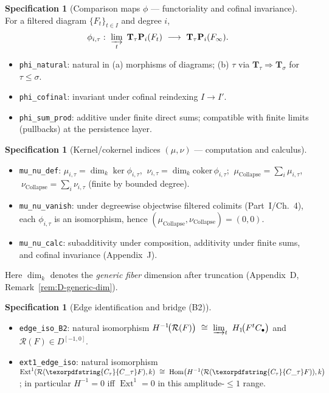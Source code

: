 \documentclass[11pt]{article}
\DeclareMathOperator{\Ext}{Ext}
\DeclareMathOperator{\Hom}{Hom}
\newcommand{\Rfun}{\mathcal{R}}
\numberwithin{equation}{section}
\theoremstyle{definition}
\newtheorem{specification}[theorem]{Specification}
\DeclareRobustCommand{\Ctau}{\texorpdfstring{\ensuremath{C_{\tau}}}{C\_\tau}}
\DeclareRobustCommand{\muc}{\mu_{\mathrm{Collapse}}}
\DeclareRobustCommand{\nuc}{\nu_{\mathrm{Collapse}}}
\begin{document}
\begin{specification}[Comparison maps $\phi$ — functoriality and cofinal invariance]
For a filtered diagram $\{F_t\}_{t\in I}$ and degree $i$,
\[
\phi_{i,\tau}:\ \varinjlim_{t}\ \mathbf{T}_\tau\mathbf{P}_i(F_t)\ \longrightarrow\ \mathbf{T}_\tau\mathbf{P}_i(F_\infty).
\]
\begin{itemize}
  \item \texttt{phi\_natural}: natural in (a) morphisms of diagrams; (b) $\tau$ via $\mathbf{T}_\tau\Rightarrow \mathbf{T}_\sigma$ for $\tau\le \sigma$.
  \item \texttt{phi\_cofinal}: invariant under cofinal reindexing $I\to I'$.
  \item \texttt{phi\_sum\_prod}: additive under finite direct sums; compatible with finite limits (pullbacks) at the persistence layer.
\end{itemize}
\end{specification}

\begin{specification}[Kernel/cokernel indices $(\mu,\nu)$ — computation and calculus]
\begin{itemize}
  \item \texttt{mu\_nu\_def}: $\mu_{i,\tau}=\dim_k\ker\phi_{i,\tau}$, $\ \nu_{i,\tau}=\dim_k\mathrm{coker}\,\phi_{i,\tau}$; $\ \muc=\sum_i\mu_{i,\tau}$, $\ \nuc=\sum_i\nu_{i,\tau}$ (finite by bounded degree).
  \item \texttt{mu\_nu\_vanish}: under degreewise objectwise filtered colimits (Part~I/Ch.~4), each $\phi_{i,\tau}$ is an isomorphism, hence $(\muc,\nuc)=(0,0)$.
  \item \texttt{mu\_nu\_calc}: subadditivity under composition, additivity under finite sums, and cofinal invariance (Appendix~J).
\end{itemize}
Here $\dim_k$ denotes the \emph{generic fiber} dimension after truncation (Appendix~D, Remark~\ref{rem:D-generic-dim}).
\end{specification}

\begin{specification}[Edge identification and bridge (B2)]
\begin{itemize}
  \item \texttt{edge\_iso\_B2}: natural isomorphism $H^{-1}\!\big(\Rfun(F)\big)\ \cong\ \varinjlim_{t}\ H_1\!\big(F^{t}C_\bullet\big)$ and $\Rfun(F)\in D^{[-1,0]}$.
  \item \texttt{ext1\_edge\_iso}: natural isomorphism $\Ext^1(\Rfun(\Ctau F),k)\ \cong\ \Hom\!\big(H^{-1}(\Rfun(\Ctau F)),k\big)$; in particular $H^{-1}=0$ iff $\Ext^1=0$ in this amplitude-$\le 1$ range.
\end{itemize}
\end{specification}
\end{document}
